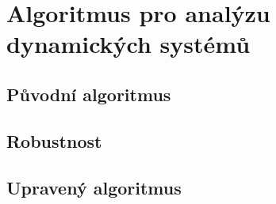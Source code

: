 \chapter{Algoritmus pro analýzu dynamických systémů}\label{chapter:algorithm}
\section{Původní algoritmus}
\section{Robustnost}
\section{Upravený algoritmus}
